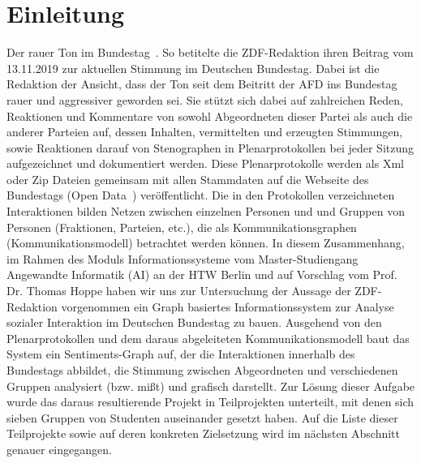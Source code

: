 \section{Einleitung}\label{sec:01_01_einleitung}
\glqq Der rauer Ton im Bundestag\grqq{}~\cite{TonImBundesTag2019}. So betitelte die ZDF-Redaktion ihren Beitrag vom 13.11.2019 zur aktuellen Stimmung im Deutschen Bundestag. Dabei ist die Redaktion der Ansicht, dass der Ton seit dem Beitritt der AFD ins Bundestag rauer und aggressiver geworden sei. Sie stützt sich dabei auf zahlreichen Reden, Reaktionen und Kommentare von sowohl Abgeordneten dieser Partei als auch die anderer Parteien auf, dessen Inhalten, vermittelten und erzeugten Stimmungen, sowie Reaktionen darauf von Stenographen in Plenarprotokollen bei jeder Sitzung aufgezeichnet und dokumentiert werden. Diese Plenarprotokolle werden als Xml oder Zip Dateien gemeinsam mit allen Stammdaten auf die Webseite des Bundestags (Open Data~\cite{OpenData2019}) veröffentlicht. Die in den Protokollen verzeichneten Interaktionen bilden Netzen zwischen einzelnen Personen und und Gruppen von Personen (Fraktionen, Parteien, etc.), die als Kommunikationsgraphen (Kommunikationsmodell) betrachtet werden können. In diesem Zusammenhang, im Rahmen des Moduls Informationssysteme vom Master-Studiengang Angewandte Informatik (AI) an der HTW Berlin und auf Vorschlag vom Prof. Dr. Thomas Hoppe haben wir uns zur Untersuchung der Aussage der ZDF-Redaktion vorgenommen ein Graph basiertes Informationssystem zur Analyse sozialer Interaktion im Deutschen Bundestag zu bauen. Ausgehend von den Plenarprotokollen und dem daraus abgeleiteten Kommunikationsmodell baut das System ein Sentiments-Graph auf, der die Interaktionen innerhalb des Bundestags abbildet, die Stimmung zwischen Abgeordneten und verschiedenen Gruppen analysiert (bzw. mißt) und grafisch darstellt. Zur Lösung dieser Aufgabe wurde das daraus resultierende Projekt in Teilprojekten unterteilt, mit denen sich sieben Gruppen von Studenten auseinander gesetzt haben. Auf die Liste dieser Teilprojekte sowie auf deren konkreten Zielsetzung wird im nächsten Abschnitt genauer eingegangen.